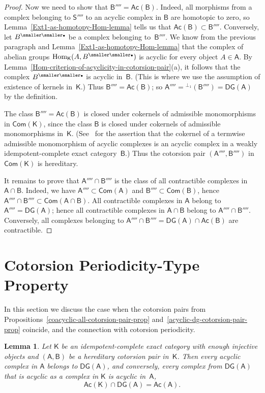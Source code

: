 \documentclass[12pt,a4paper]{amsart}
\newcommand{\+}{\nobreakdash-}
\renewcommand{\:}{\colon}
\newcommand{\bu}{{\text{\smaller\smaller$\scriptstyle\bullet$}}}
\DeclareMathOperator{\Hom}{Hom}
\newcommand{\sA}{\mathsf A}
\newcommand{\sB}{\mathsf B}
\newcommand{\sK}{\mathsf K}
\newcommand{\sS}{\mathsf S}
\newcommand{\Com}{\mathsf{Com}}
\newcommand{\Ac}{\mathsf{Ac}}
\newcommand{\DG}{\mathsf{DG}}
\newcommand{\Section}[1]{\bigskip\section{#1}\medskip}
\theoremstyle{plain}
\newtheorem{lem}[thm]{Lemma}
\theoremstyle{definition}
\begin{document}
\begin{proof}
 Now we need to show that $\sB''''=\Ac(\sB)$.
 Indeed, all morphisms from a complex belonging to $\sS''''$ to
an acyclic complex in $\sB$ are homotopic to zero, so
Lemma~\ref{Ext1-as-homotopy-Hom-lemma} tells us that
$\Ac(\sB)\subset\sB''''$.
 Conversely, let $B^\bu$ be a complex belonging to~$\sB''''$.
 We know from the previous paragraph and
Lemma~\ref{Ext1-as-homotopy-Hom-lemma} that the complex of abelian
groups $\Hom_\sK(A,B^\bu)$ is acyclic for every object $A\in\sA$.
 By Lemma~\ref{Hom-criterion-of-acyclicity-in-cotorsion-pair}(a),
it follows that the complex $B^\bu$ is acyclic in~$\sB$.
 (This is where we use the assumption of existence of kernels in~$\sK$.)
 Thus $\sB''''=\Ac(\sB)$; so $\sA''''={}^{\perp_1}(\sB'''')=\DG(\sA)$
by the definition.

 The class $\sB''''=\Ac(\sB)$ is closed under cokernels of admissible
monomorphisms in $\Com(\sK)$, since the class $\sB$ is closed under
cokernels of admissible monomorphisms in~$\sK$.
 (See~\cite[Corollary~3.6 and the dual version of Proposition~7.6]{Bueh}
for the assertion that the cokernel of a termwise admissible
monomorphism of acyclic complexes is an acyclic complex in a weakly
idempotent-complete exact category~$\sB$.)
 Thus the cotorsion pair $(\sA'''',\sB'''')$ in $\Com(\sK)$ is
hereditary.

 It remains to prove that $\sA''''\cap\sB''''$ is the class of all
contractible complexes in $\sA\cap\sB$.
 Indeed, we have $\sA''''\subset\Com(\sA)$ and
$\sB''''\subset\Com(\sB)$, hence
$\sA''''\cap\sB''''\subset\Com(\sA\cap\sB)$.
 All contractible complexes in $\sA$ belong to~$\sA''''=\DG(\sA)$;
hence all contractible complexes in $\sA\cap\sB$ belong to
$\sA''''\cap\sB''''$.
 Conversely, all complexes belonging to $\sA''''\cap\sB''''=
\DG(\sA)\cap\Ac(\sB)$ are contractible.
\end{proof}


\Section{Cotorsion Periodicity-Type Property}

 In this section we discuss the case when the cotorsion pairs from
Propositions~\ref{coacyclic-all-cotorsion-pair-prop}
and~\ref{acyclic-dg-cotorsion-pair-prop} coincide, and the connection
with cotorsion periodicity.

\begin{lem} \label{DG-A-intersect-Ac-K-is-Ac-A}
 Let\/ $\sK$ be an idempotent-complete exact category with enough
injective objects and $(\sA,\sB)$ be a hereditary cotorsion pair
in\/~$\sK$.
 Then every acyclic complex in\/ $\sA$ belongs to\/ $\DG(\sA)$, and
conversely, every complex from\/ $\DG(\sA)$ that is acyclic as
a complex in\/ $\sK$ is acyclic in\/~$\sA$,
$$
 \Ac(\sK)\cap\DG(\sA)=\Ac(\sA).
$$
\end{lem}
\end{document}
